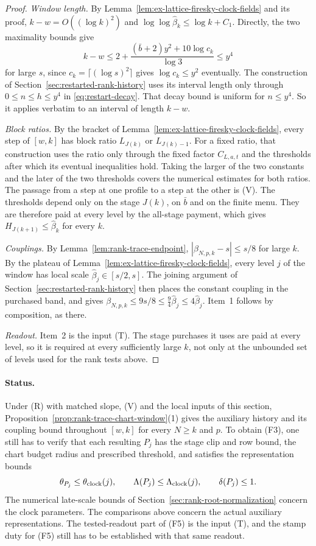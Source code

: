 \begin{proof}
\emph{Window length.} By
Lemma~\ref{lem:ex-lattice-firesky-clock-fields} and its proof,
$k-w=O((\log k)^2)$ and $\log\log\widehat\beta_k\le\log k+C_1$. Directly,
the two maximality bounds give
\[
 k-w\le2+\frac{(\bar b+2)y^2+10\log c_k}{\log3}\le y^4
\]
for large $s$, since $c_k=\lceil(\log s)^2\rceil$ gives
$\log c_k\le y^2$ eventually. The construction of
Section~\ref{sec:restarted-rank-history} uses its interval length only
through $0\le n\le h\le y^4$ in \eqref{eq:restart-decay}. That decay
bound is uniform for $n\le y^4$. So it applies verbatim to an interval
of length $k-w$.

\emph{Block ratios.} By the bracket of
Lemma~\ref{lem:ex-lattice-firesky-clock-fields}, every step of $[w,k]$
has block ratio $L_{J(k)}$ or $L_{J(k)-1}$. For a fixed ratio, that
construction uses the ratio only through the fixed factor $C_{L,a,t}$
and the thresholds after which its eventual inequalities hold. Taking
the larger of the two constants and the later of the two thresholds
covers the numerical estimates for both ratios. The passage from a step
at one profile to a step at the other is (V). The
thresholds depend only on the stage $J(k)$, on $\bar b$ and on the
finite menu. They are therefore paid at every level by the all-stage
payment, which gives $H_{J(k+1)}\le\widehat\beta_k$ for every $k$.

\emph{Couplings.} By Lemma~\ref{lem:rank-trace-endpoint},
$|\beta_{N,p,k}-s|\le s/8$ for large $k$. By the plateau of
Lemma~\ref{lem:ex-lattice-firesky-clock-fields}, every level $j$ of the
window has local scale $\widehat\beta_j\in[s/2,s]$. The joining argument
of Section~\ref{sec:restarted-rank-history} then places the constant
coupling in the purchased band, and gives
$\beta_{N,p,k}\le9s/8\le\tfrac94\widehat\beta_j\le4\widehat\beta_j$.
Item~1 follows by composition, as there.

\emph{Readout.} Item~2 is the input (T). The stage purchases it uses
are paid at every level, so it is required at every sufficiently large
$k$, not only at the unbounded set of levels used for the rank tests
above.
\end{proof}

\paragraph{Status.}
Under (R) with matched slope, (V) and the local inputs of this section,
Proposition~\ref{prop:rank-trace-chart-window}(1) gives the auxiliary
history and its coupling bound throughout $[w,k]$ for every $N\ge k$
and $p$. To obtain (F3), one still has to verify that each resulting
$P_j$ has the stage clip and row bound, the chart budget radius and
prescribed threshold, and satisfies the representation bounds
\[
 \theta_{P_j}\le\theta_{\rm clock}(j),\qquad
 \Lambda(P_j)\le\Lambda_{\rm clock}(j),\qquad \delta(P_j)\le1 .
\]
The numerical late-scale bounds of
Section~\ref{sec:rank-root-normalization} concern the clock parameters. The comparisons above concern the actual
auxiliary representations. The tested-readout part of (F5) is the input
(T), and the stamp duty for (F5) still has to be established with that
same readout.
